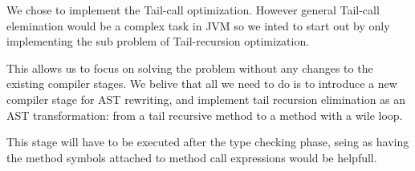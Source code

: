 We chose to implement the Tail-call optimization. However general Tail-call elemination would be a complex task in JVM so we inted to start out by only implementing the sub problem of Tail-recursion optimization.

This allows us to focus on solving the problem without any changes to the existing compiler stages. We belive that all we need to do is to introduce a new compiler stage for AST rewriting, and implement tail recursion elimination as an AST transformation: from a tail recursive method to a method with a wile loop.

This stage will have to be executed after the type checking phase, seing as having the method symbols attached to method call expressions would be helpfull.
